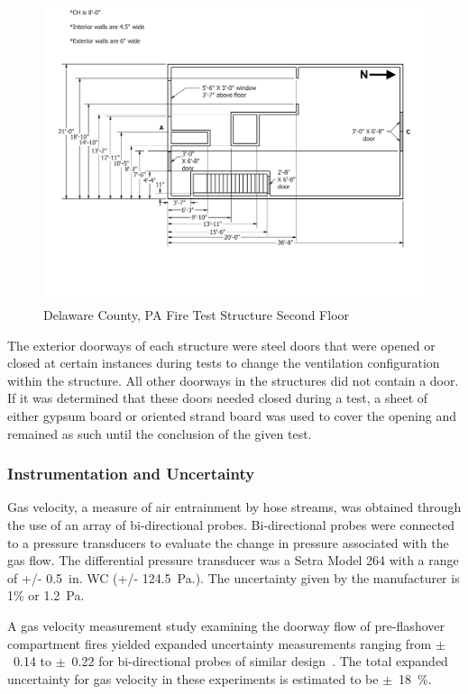\documentclass{article}
\begin{document}
\begin{figure}[!ht]
	\centering
	\includegraphics[width=\columnwidth]{Figures/Air_Entrainment/West_Test_Structure_2nd_Floor_nodim.pdf}
	\caption{Delaware County, PA Fire Test Structure Second Floor}
	\label{fig:Delaware_County,_PA_Fire_Test_Structure_Second_Floor}
\end{figure}

The exterior doorways of each structure were steel doors that were opened or closed at certain instances during tests to change the ventilation configuration within the structure. All other doorways in the structures did not contain a door. If it was determined that these doors needed closed during a test, a sheet of either gypsum board or oriented strand board was used to cover the opening and remained as such until the conclusion of the given test.

\subsubsection{Instrumentation and Uncertainty}
Gas velocity, a measure of air entrainment by hose streams, was obtained through the use of an array of bi-directional probes. Bi-directional probes were connected to a pressure transducers to evaluate the change in pressure associated with the gas flow. The differential pressure transducer was a Setra Model 264 with a range of +/- 0.5~in. WC (+/- 124.5~Pa.). The uncertainty given by the manufacturer is 1\% or 1.2~Pa. 

A gas velocity measurement study examining the doorway flow of pre-flashover compartment fires yielded expanded uncertainty measurements ranging from $\pm$~0.14 to $\pm$~0.22 for bi-directional probes of similar design~\cite{Bryant:FSJ2009}. The total expanded uncertainty for gas velocity in these experiments is estimated to be $\pm$~18~\%.
\end{document}
